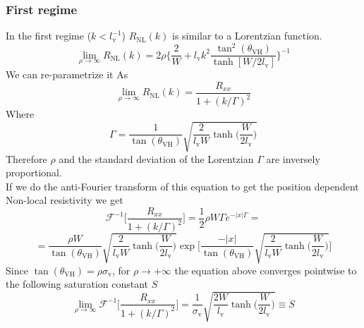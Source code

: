 \subsubsection*{First regime}
In the first regime ($k< l_{\textrm{v}}^{-1}$) $R_{\textrm{NL}}(k)$ is similar to a Lorentzian function.
\begin{equation}
    \lim_{\rho\to\infty} R_{\textrm{NL}}(k)=2\rho
    \bigg\{
        \frac 2W+ l_{\textrm{v}}k^2\frac{\tan^2(\theta_{\textrm{VH}})}{\tanh[W/2l_{\textrm{v}}]}  
    \bigg\}^{-1}
\end{equation}
We can re-parametrize it As
\begin{equation}
    \lim_{\rho\to\infty} R_{\textrm{NL}}(k)=\frac{R_{xx}}{1+(k/\Gamma)^2}
\end{equation}
Where 
\[
    \Gamma=\frac 1 {\tan(\theta_{\textrm{VH}})}\sqrt{\frac 2{l_{\textrm{v}}W} \tanh\bigg(\frac W{2l_{\textrm{v}}}\bigg)}
\]
Therefore $\rho$ and the standard deviation of the Lorentzian $\Gamma$ are inversely proportional.\\
If we do the anti-Fourier transform of this equation to get the position dependent Non-local resistivity we get 
\[
    \mathcal F^{-1}\bigg[\frac{R_{xx}}{1+(k/\Gamma)^2} \bigg]=\frac 12\rho W\Gamma {e^{-|x|\Gamma}}=
\]
\begin{equation}
    =\frac {\rho W}{\tan(\theta_{\textrm{VH}})}\sqrt{\frac 2{l_{\textrm{v}} W}\tanh\bigg(\frac W{2l_{\textrm{v}}}\bigg)}
    \exp\Bigg[
        \frac{-|x|}{\tan(\theta_{\textrm{VH}})}\sqrt{\frac 2{l_{\textrm{v}} W}\tanh\bigg(\frac W{2l_{\textrm{v}}}\bigg)}
    \Bigg]
\end{equation}
Since $\tan(\theta_{\textrm{VH}})=\rho \sigma_{\textrm{v}}$, for $\rho\to +\infty$ the equation above converges pointwise to the following saturation constant $S$
\begin{equation}
    \lim_{\rho\to\infty}\mathcal F^{-1}\bigg[\frac{R_{xx}}{1+(k/\Gamma)^2} \bigg]=\frac 1{\sigma_{\textrm{v}}}\sqrt{\frac {2W}{l_{\textrm{v}}}\tanh\bigg(\frac W{2l_{\textrm{v}}} \bigg)}\equiv S
\end{equation}

